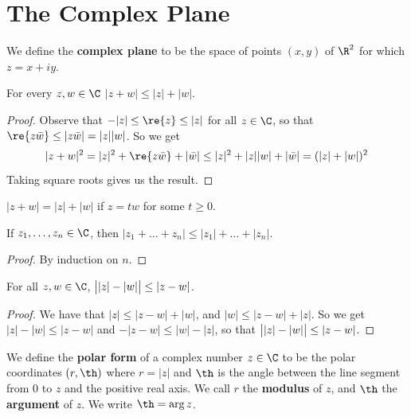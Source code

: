 \section{The Complex Plane}

\begin{definition}
    We define the \textbf{complex plane} to be the space of points $(x,y)$ of
    $\R^2$ for which  $z=x+iy$.
\end{definition}

\begin{lemma}\label{1.2.1}
    For every $z,w \in \C$  $|z+w| \leq |z|+|w|$.
\end{lemma}
\begin{proof}
    Observe that $-|z| \leq \re{z} \leq |z|$ for all $z \in \C$, so that
    $\re{z\bar{w}} \leq |z\bar{w}|=|z||w|$. So we get
    \begin{equation*}
        |z+w|^2=|z|^2+\re{z\bar{w}}+|\bar{w}| \leq
        |z|^2+|z||w|+|\bar{w}|=(|z|+|w|)^2
    \end{equation*}
    Taking square roots gives us the result.
\end{proof}
\begin{corollary}
    $|z+w|=|z|+|w|$ if  $z=tw$ for some  $t \geq 0$.
\end{corollary}
\begin{corollary}
    If $z_1, \dots, z_n \in \C$, then $|z_1+\dots+z_n| \leq
    |z_1|+\dots+|z_n|$.
\end{corollary}
\begin{proof}
    By induction on $n$.
\end{proof}
\begin{corollary}
    For all $z,w \in \C$,  $\big{|}|z|-|w|\big{|} \leq |z-w|$.
\end{corollary}
\begin{proof}
    We have that $|z| \leq |z-w|+|w|$, and $|w| \leq |z-w|+|z|$. So
    we get $|z|-|w| \leq |z-w|$ and $-|z-w| \leq |w|-|z|$, so that
    $\big{|}|z|-|w|\big{|} \leq |z-w|$.
\end{proof}

\begin{definition}
    We define the \textbf{polar form} of a complex number $z \in \C$ to be the
    polar coordinates  $(r,\th)$ where $r=|z|$ and  $\th$ is the angle between
    the line segment from  $0$ to  $z$ and the positive real axis. We call  $r$
    the \textbf{modulus} of $z$, and  $\th$ the  \textbf{argument} of $z$. We
    write $\th=\arg{z}$.
\end{definition}

